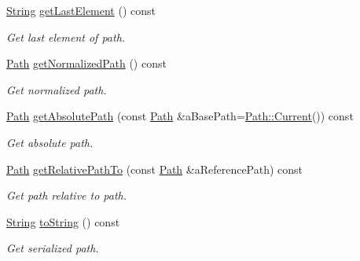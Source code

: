 \begin{DoxyCompactItemize}
\mbox{\hyperlink{classlibrary_1_1core_1_1types_1_1_string}{String}} \mbox{\hyperlink{classlibrary_1_1core_1_1fs_1_1_path_a1beabf215fcc96dde591838556e00370}{get\+Last\+Element}} () const
\begin{DoxyCompactList}\small\item\em Get last element of path. \end{DoxyCompactList}\item 
\mbox{\hyperlink{classlibrary_1_1core_1_1fs_1_1_path}{Path}} \mbox{\hyperlink{classlibrary_1_1core_1_1fs_1_1_path_a920b1d062cb1274da811150afafba124}{get\+Normalized\+Path}} () const
\begin{DoxyCompactList}\small\item\em Get normalized path. \end{DoxyCompactList}\item 
\mbox{\hyperlink{classlibrary_1_1core_1_1fs_1_1_path}{Path}} \mbox{\hyperlink{classlibrary_1_1core_1_1fs_1_1_path_a3a4c995e4b1ca0f26abbf65d3a244446}{get\+Absolute\+Path}} (const \mbox{\hyperlink{classlibrary_1_1core_1_1fs_1_1_path}{Path}} \&a\+Base\+Path=\mbox{\hyperlink{classlibrary_1_1core_1_1fs_1_1_path_adbdaa4e7ab2a1b399746782668863e53}{Path\+::\+Current}}()) const
\begin{DoxyCompactList}\small\item\em Get absolute path. \end{DoxyCompactList}\item 
\mbox{\hyperlink{classlibrary_1_1core_1_1fs_1_1_path}{Path}} \mbox{\hyperlink{classlibrary_1_1core_1_1fs_1_1_path_a8f24340e887cfbfe675e96c0ba92321f}{get\+Relative\+Path\+To}} (const \mbox{\hyperlink{classlibrary_1_1core_1_1fs_1_1_path}{Path}} \&a\+Reference\+Path) const
\begin{DoxyCompactList}\small\item\em Get path relative to path. \end{DoxyCompactList}\item 
\mbox{\hyperlink{classlibrary_1_1core_1_1types_1_1_string}{String}} \mbox{\hyperlink{classlibrary_1_1core_1_1fs_1_1_path_a6f78df53d8e604dd9e1b43e23311724a}{to\+String}} () const
\begin{DoxyCompactList}\small\item\em Get serialized path. \end{DoxyCompactList}\end{DoxyCompactItemize}

